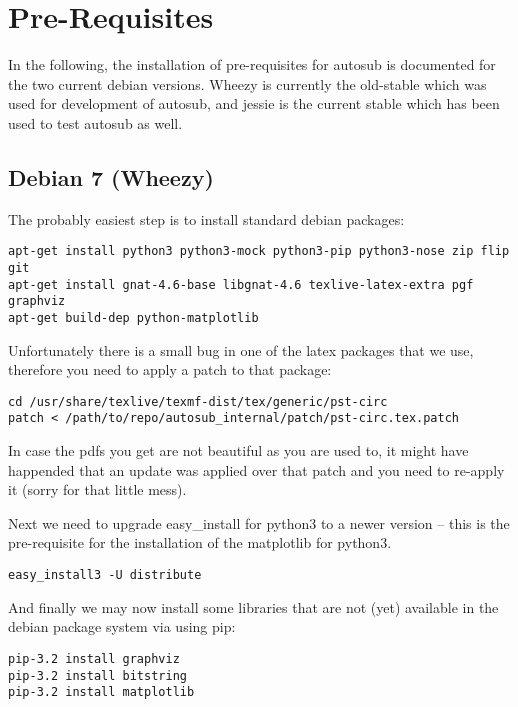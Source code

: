 \section{Pre-Requisites} \label{sec:installation}

In the following, the installation of pre-requisites for autosub is documented for 
the two current debian versions. Wheezy is currently the old-stable which was used 
for development of autosub, and jessie is the current stable which has been used to 
test autosub as well.

\subsection{Debian 7 (Wheezy)}

The probably easiest step is to install standard debian packages:

\begin{verbatim}
apt-get install python3 python3-mock python3-pip python3-nose zip flip git
apt-get install gnat-4.6-base libgnat-4.6 texlive-latex-extra pgf graphviz
apt-get build-dep python-matplotlib
\end{verbatim}

Unfortunately there is a small bug in one of the latex packages that we use,
therefore you need to apply a patch to that package:

\begin{verbatim}
cd /usr/share/texlive/texmf-dist/tex/generic/pst-circ
patch < /path/to/repo/autosub_internal/patch/pst-circ.tex.patch
\end{verbatim}

In case the pdfs you get are not beautiful as you are used to, it might have
happended that an update was applied over that patch and you need to re-apply it (sorry for that little mess).


Next we need to upgrade easy\_install for python3 to a newer version -- this
is the pre-requisite for the installation of the matplotlib for python3.

\begin{verbatim}
easy_install3 -U distribute
\end{verbatim}

And finally we may now install some libraries that are not (yet) available in
the debian package system via using pip:

\begin{verbatim}
pip-3.2 install graphviz
pip-3.2 install bitstring
pip-3.2 install matplotlib
\end{verbatim}

